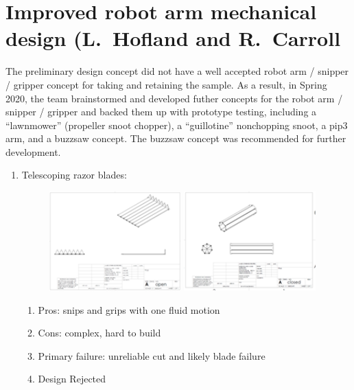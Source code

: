 \section{Improved robot arm mechanical design (L.~Hofland and R.~Carroll}
\label{sec:robotarmmechanical}

The preliminary design concept did not have a well accepted robot arm / snipper / gripper concept for taking and retaining the sample. As a result, in Spring 2020, the team brainstormed and developed futher concepts for the robot arm / snipper / gripper and backed them up with prototype testing, including a ``lawnmower'' (propeller snoot chopper), a ``guillotine'' nonchopping snoot, a pip3 arm, and a buzzsaw concept. The buzzsaw concept was recommended for further development. 

\begin{enumerate}
\item Telescoping razor blades:
\begin{figure}
\begin{center}
\includegraphics[height=1.5in]{figures/robotarmmech1a.png}
\includegraphics[height=1.5in]{figures/robotarmmech1b.png}
\end{center}
\end{figure}
\begin{enumerate}
\item Pros: snips and grips with one fluid motion
\item Cons: complex, hard to build
\item Primary failure: unreliable cut and likely blade failure
\item Design Rejected
\end{enumerate}


\end{enumerate}
